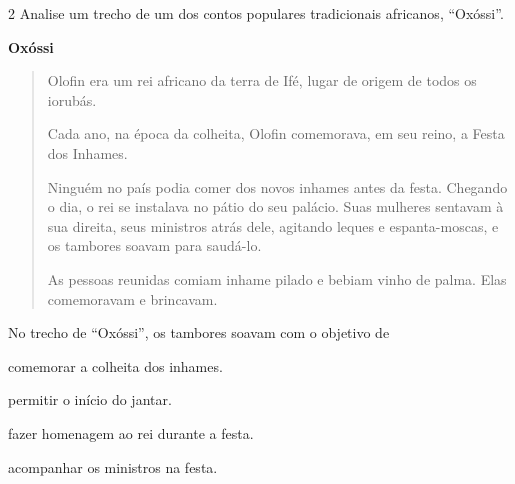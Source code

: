 
\num{2} Analise um trecho de um dos contos populares tradicionais africanos, ``Oxóssi''.

\textbf{Oxóssi}

\begin{quote}
Olofin era um rei africano da terra de Ifé, lugar de origem de todos os
iorubás.

Cada ano, na época da colheita, Olofin comemorava, em seu reino, a Festa
dos Inhames.

Ninguém no país podia comer dos novos inhames antes da festa. Chegando o
dia, o rei se instalava no pátio do seu palácio. Suas mulheres sentavam 
à sua direita, seus ministros atrás dele, agitando leques e 
espanta-moscas, e os tambores soavam para saudá-lo.

As pessoas reunidas comiam inhame pilado e bebiam vinho de palma. Elas
comemoravam e brincavam.
\end{quote}



No trecho de ``Oxóssi'', os tambores soavam com o objetivo de

\begin{escolha}
\item comemorar a colheita dos inhames.

\item permitir o início do jantar.

\item fazer homenagem ao rei durante a festa.

\item acompanhar os ministros na festa.
\end{escolha}

